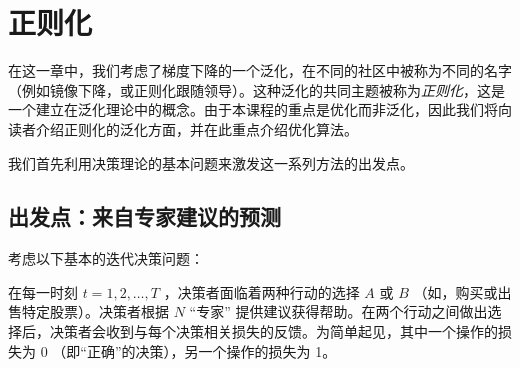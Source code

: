 \chapter{
    正则化
    } \label{chap:regularization}

在这一章中，我们考虑了梯度下降的一个泛化，在不同的社区中被称为不同的名字（例如镜像下降，或正则化跟随领导）。这种泛化的共同主题被称为{\it 正则化}，这是一个建立在泛化理论中的概念。由于本课程的重点是优化而非泛化，因此我们将向读者介绍正则化的泛化方面，并在此重点介绍优化算法。

我们首先利用决策理论的基本问题来激发这一系列方法的出发点。

\section{
    出发点：来自专家建议的预测
    } \label{sec:experts}

考虑以下基本的迭代决策问题：

在每一时刻  $t=1,2,\ldots,T$ ，决策者面临着两种行动的选择 $A$ 或 $B$ （如，购买或出售特定股票）。决策者根据 $N$ “专家” 提供建议获得帮助。在两个行动之间做出选择后，决策者会收到与每个决策相关损失的反馈。为简单起见，其中一个操作的损失为 0 （即“正确”的决策），另一个操作的损失为 1。

